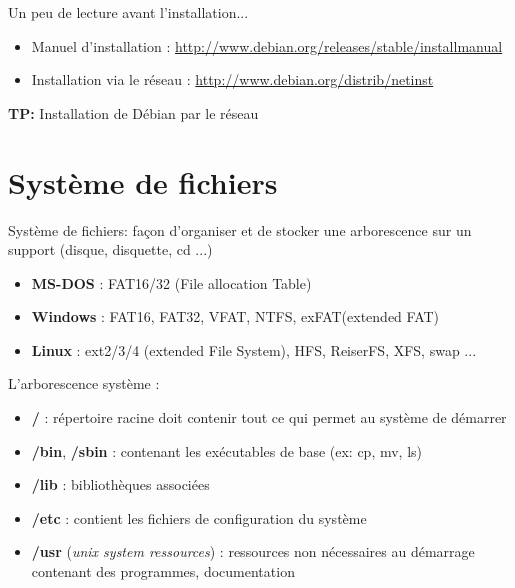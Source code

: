 \documentclass[french]{beamer}
\begin{document}
\begin{frame}
Un peu de lecture avant l'installation...
\begin{itemize}
\item Manuel d'installation : \url{http://www.debian.org/releases/stable/installmanual}
\item Installation via le réseau : \url{http://www.debian.org/distrib/netinst}
\end{itemize}
\textbf{TP:} Installation de Débian par le réseau
\end{frame} 

\section{Système de fichiers}
\frame{\tableofcontents[current]}

\begin{frame}
\begin{center}
Système de fichiers: façon d'organiser et de stocker une arborescence sur
un support (disque, disquette, cd ...)
\end{center}
    \begin{itemize}
    \item \textbf{MS-DOS} : FAT16/32 (File allocation Table)
    \item \textbf{Windows} : FAT16, FAT32, VFAT, NTFS, exFAT(extended FAT)
    \item \textbf{Linux} : ext2/3/4 (extended File System), HFS, ReiserFS, XFS, swap ...
    \end{itemize}
\end{frame}

\begin{frame}
L'arborescence système :
    \begin{itemize}
    \item \textbf{/} : répertoire racine doit contenir tout ce qui permet au système de démarrer
    \item \textbf{/bin}, \textbf{/sbin} : contenant les exécutables de base (ex: cp, mv, ls)
    \item \textbf{/lib} : bibliothèques associées 
    \item \textbf{/etc} : contient les fichiers de configuration du système
    \item \textbf{/usr} (\textit{unix system ressources}) : ressources non nécessaires au démarrage contenant des programmes, documentation
    \end{itemize}
 \end{frame}
 
\end{document}
